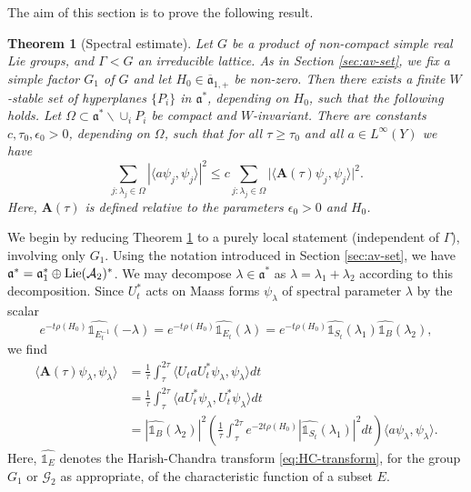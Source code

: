 \documentclass[12pt]{amsart}
\newtheorem{theorem}{Theorem}[section]
\theoremstyle{remark}
\newcommand{\ga}{\mathfrak a}
\begin{document}
The aim of this section is to prove the following result. 

\begin{theorem}[Spectral estimate]\label{main-spec-thm} Let $G$ be a product of non-compact simple real Lie groups, and $\Gamma<G$ an irreducible lattice. As in Section \ref{sec:av-set}, we fix a simple factor $G_1$ of $G$ and let $H_0\in \overline{\ga}_{1,+}$ be non-zero. Then there exists a finite $W$-stable set of hyperplanes $\{ P_i\}$ in $\ga^*$, depending on $H_0$, such that the following holds. Let $\Omega \subset \ga^*\smallsetminus\cup_i P_i$ be compact and $W$-invariant. There are constants $c, \tau_0, \epsilon_0 > 0$, depending on $\Omega$, such that for all $\tau \geq \tau_0$ and all $a\in L^\infty(Y)$ we have 
\[
\sum_{j: \lambda_j\in\Omega} |\langle a\psi_j,\psi_j\rangle|^2\le c\sum_{j:\lambda_j\in\Omega}\Big|\langle \mathbf{A}(\tau)\psi_j,\psi_j\rangle \Big|^2.
\]
Here, $\mathbf{A}(\tau)$ is defined relative to the parameters $\epsilon_0>0$ and $H_0$. 
\end{theorem}

We begin by reducing Theorem \ref{main-spec-thm} to a purely local statement (independent of $\Gamma$),  involving only $G_1$. Using the notation introduced in Section \ref{sec:av-set}, we have $\ga^*=\ga_1^*\oplus {\rm Lie}(\mathcal{A}_2)^*$. We may decompose $\lambda\in\ga^*$ as $\lambda=\lambda_1+\lambda_2$ according to this decomposition. Since $U_t^*$ acts on Maass forms $\psi_\lambda$ of spectral parameter $\lambda$ by the scalar
\[
e^{-t \rho(H_0)} \widehat{\mathds{1}_{E_t^{-1}}}(-\lambda) = e^{-t \rho(H_0)}\widehat{\mathds{1}_{E_t}}(\lambda) = e^{-t \rho(H_0)}\widehat{\mathds{1}_{S_t}}(\lambda_1)\widehat{\mathds{1}_B}(\lambda_2),
\]
we find
\begin{align}
\langle \mathbf{A}(\tau)\psi_\lambda,\psi_\lambda\rangle&=\frac{1}{\tau}\int_{\tau}^{2\tau} \langle U_t a U_t^*\psi_\lambda,\psi_\lambda\rangle dt\nonumber\\
&=\frac{1}{\tau}\int_{\tau}^{2\tau} \langle a U_t^*\psi_\lambda, U_t^*\psi_\lambda\rangle dt\nonumber\\
&= |\widehat{\mathds{1}_B}(\lambda_2)|^2 \left(\frac{1}{\tau}\int_{\tau}^{2\tau} e^{-2t \rho(H_0)}|\widehat{\mathds{1}_{S_t}}(\lambda_1)|^2 dt\right)\langle a\psi_\lambda,\psi_\lambda\rangle.\label{local factors}
\end{align}
Here, $\widehat{\mathds{1}_E}$ denotes the Harish-Chandra transform \eqref{eq:HC-transform}, for the group $G_1$ or $\mathcal{G}_2$ as appropriate, of the characteristic function of a subset $E$.
\end{document}
